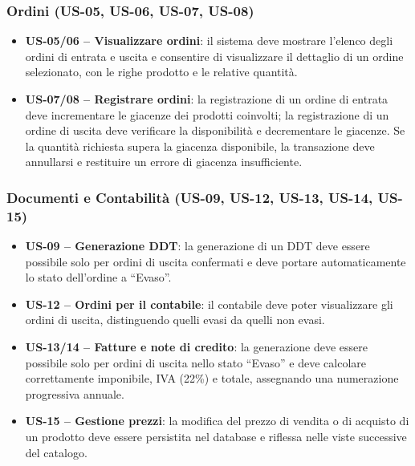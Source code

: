 \documentclass[a4paper,12pt]{article}
\begin{document}
\subsubsection*{Ordini (US-05, US-06, US-07, US-08)}
\begin{itemize}
    \item \textbf{US-05/06 -- Visualizzare ordini}: il sistema deve mostrare l'elenco degli ordini di entrata e uscita e consentire di visualizzare il dettaglio di un ordine selezionato, con le righe prodotto e le relative quantit\`{a}.
    \item \textbf{US-07/08 -- Registrare ordini}: la registrazione di un ordine di entrata deve incrementare le giacenze dei prodotti coinvolti; la registrazione di un ordine di uscita deve verificare la disponibilit\`{a} e decrementare le giacenze. Se la quantit\`{a} richiesta supera la giacenza disponibile, la transazione deve annullarsi e restituire un errore di giacenza insufficiente.
\end{itemize}

\subsubsection*{Documenti e Contabilit\`{a} (US-09, US-12, US-13, US-14, US-15)}
\begin{itemize}
    \item \textbf{US-09 -- Generazione DDT}: la generazione di un DDT deve essere possibile solo per ordini di uscita confermati e deve portare automaticamente lo stato dell'ordine a ``Evaso''.
    \item \textbf{US-12 -- Ordini per il contabile}: il contabile deve poter visualizzare gli ordini di uscita, distinguendo quelli evasi da quelli non evasi.
    \item \textbf{US-13/14 -- Fatture e note di credito}: la generazione deve essere possibile solo per ordini di uscita nello stato ``Evaso'' e deve calcolare correttamente imponibile, IVA (22\%) e totale, assegnando una numerazione progressiva annuale.
    \item \textbf{US-15 -- Gestione prezzi}: la modifica del prezzo di vendita o di acquisto di un prodotto deve essere persistita nel database e riflessa nelle viste successive del catalogo.
\end{itemize}
\end{document}
